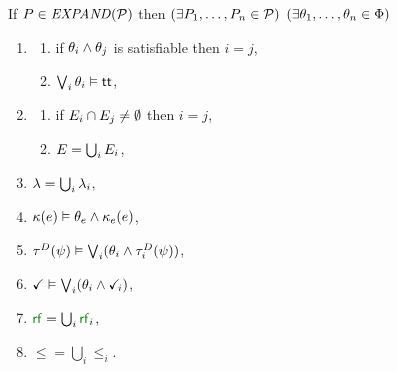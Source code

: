  \noindent
  If $\aPS \in \sEXPAND\aPSS$ then
  $(\exists P_1,\ldots,P_n\in\mathcal{P})$
  $(\exists\theta_1,\ldots,\theta_n\in\Phi)$
  \begin{multicols}{2}
    \begin{enumerate}[topsep=0pt,label=(\textsc{e}\arabic*),ref=\textsc{e}\arabic*]
    \item[] \label{ca-psi}
      \begin{enumerate}[leftmargin=0pt]
      \item if $\theta_i\land\theta_j$ is satisfiable then $i=j$,        
      \item $\bigvee_i\theta_i\mathrel{\vDash}\mathsf{tt}$,        
      \end{enumerate}
    \item[] \label{ca-E}
      \begin{enumerate}[leftmargin=0pt]
      \item if $E_i\cap E_j\neq\emptyset$ then $i=j$,
      \item $E=\bigcup_iE_i$, %
      \end{enumerate}
    \item \label{ca-lambda}
      ${\lambda}=\bigcup_i{\lambda_i}$,%
    \item \label{ca-kappa}
      \begin{math}
        \kappa(e) \mathrel{\vDash}
        \theta_e\land \kappa_e(e)
      \end{math},
    \item \label{ca-tau}
      \begin{math}
        \aTr{\bEvs}{\bForm} \rimplies 
        \bigvee_i (\cForm_i\land \aTr[i]{\bEvs}{\bForm})
      \end{math},
    \item \label{ca-term}
      $\aTerm \rimplies \bigvee_i (\cForm_i\land \aTerm[i])$,
    \item ${\rrfx}=\bigcup_i{\rrfx_i}$,
    \item ${\le}=\bigcup_i{\le_i}$.
    \end{enumerate}
  \end{multicols}


